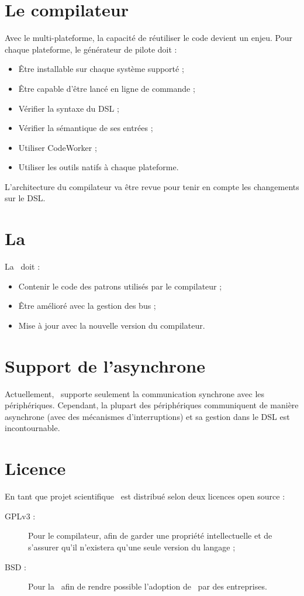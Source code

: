 \documentclass[chapterprefix=off]{rtxreport}
\begin{document}
\section{Le compilateur}

Avec le multi-plateforme, la capacité de réutiliser le code devient un enjeu.
Pour chaque plateforme, le générateur de pilote doit :
\begin{itemize}
\item Être installable sur chaque système supporté ;
\item Être capable d'être lancé en ligne de commande ;
\item Vérifier la syntaxe du DSL ;
\item Vérifier la sémantique de ses entrées ;
\item Utiliser CodeWorker\cite{CodeWorker} ;
\item Utiliser les outils natifs à chaque plateforme.
\end{itemize}

L'architecture du compilateur va être revue pour tenir en compte les
changements sur le DSL.

\section{La \BL}

La \BL\ doit :
\begin{itemize}
\item Contenir le code des patrons utilisés par le compilateur ;
\item Être amélioré avec la gestion des bus ;
\item Mise \`a jour avec la nouvelle version du compilateur.
\end{itemize}

\section{Support de l'asynchrone}

Actuellement, \rtx\ supporte seulement la communication synchrone avec les
périphériques. Cependant, la plupart des périphériques communiquent de manière
asynchrone (avec des mécanismes d'interruptions) et sa gestion dans le DSL est
incontournable.

\section{Licence}

En tant que projet scientifique \rtx\ est distribué selon deux licences open
source :
\begin{description}
\item[GPLv3 :] Pour le compilateur, afin de garder une propriété intellectuelle
et de s'assurer qu'il n'existera qu'une seule version du langage ;
\item[BSD :] Pour la \BL\ afin de rendre possible l'adoption de \rtx\ par des
entreprises.
\end{description}
\end{document}
